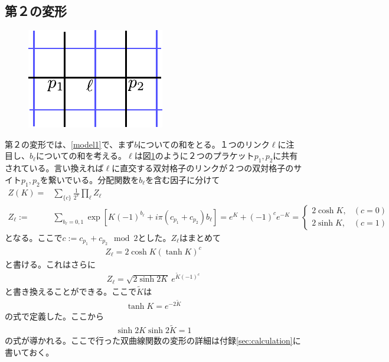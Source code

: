 \documentclass[a4paper,12pt,dvipdfmx]{jlreq}
\newcommand{\Kt}{\widetilde{K}}
\begin{document}
\subsection{第２の変形}
\label{sec:second}
\begin{figure}
  \centering
  \includegraphics{link_plaquette.pdf}
  \caption{{}}
  \label{fig:link_plaquette}
\end{figure}

第２の変形では、\eqref{model1}で、まず$b$についての和をとる。１つのリンク$\ell$に注目し、$b_{\ell}$についての和を考える。$\ell$は図\ref{fig:link_plaquette}のように２つのプラケット$p_1,p_2$に共有されている。言い換えれば$\ell$に直交する双対格子のリンクが２つの双対格子のサイト$p_1,p_2$を繋いでいる。分配関数を$b_{\ell}$を含む因子に分けて
\begin{align}
  Z(K)=&\sum_{\{c\}}\frac{1}{2^V}\prod_{\ell}Z_{\ell}\\
  Z_{\ell}:=&\sum_{b_{\ell}=0,1}\exp\left[
    K(-1)^{b_{\ell}}+i\pi (c_{p_1}+c_{p_2})b_{\ell}
  \right]
  =e^{K}+(-1)^{c}e^{-K}
  =
  \begin{cases}
    2\cosh K, & (c=0)\\
    2\sinh K, & (c=1)
  \end{cases}
\end{align}
となる。ここで$c:=c_{p_1}+c_{p_2} \mod 2$とした。$Z_{\ell}$はまとめて
\begin{align}
  Z_{\ell}=2\cosh K (\tanh K)^{c}
\end{align}
と書ける。これはさらに\begin{align}
  Z_{\ell}=\sqrt{2\sinh 2K}\ e^{\Kt(-1)^c}\label{Zelltemp}
\end{align}
と書き換えることができる。ここで$\Kt$は
\begin{align}
  \tanh K = e^{-2\Kt}
\end{align}
の式で定義した。ここから
\begin{align}
  \sinh 2 K \sinh 2\Kt =1 \label{dualK}
\end{align}
の式が導かれる。ここで行った双曲線関数の変形の詳細は付録\ref{sec:calculation}に書いておく。
\end{document}
